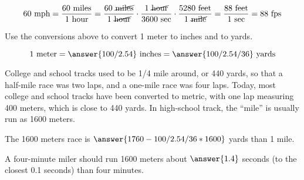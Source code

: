 \documentclass[nooutcomes]{ximera}
\begin{document}
\[
60 \textrm{ mph} = \frac{60\textrm{ miles}}{1\textrm{ hour}} 
=  \frac{60\textrm{ \cancel{miles}}}{1\textrm{ \cancel{hour}}} \cdot \frac{1\textrm{ \cancel{hour}}}{3600\textrm{ sec}} \cdot 
\frac{5280\textrm{ feet}}{{1\textrm{ \cancel{mile}}}} = \frac{88\textrm{ feet}}{1\textrm{ sec}} = 88 \textrm{ fps}
\]

\begin{question}
Use the conversions above to convert 1 meter to inches and to yards. 

\[
1\textrm{ meter} = \answer{100/2.54}\textrm{ inches} = \answer{100/2.54/36} \textrm{ yards}
\] 

\end{question}

\begin{question}
College and school tracks used to be 1/4 mile around, or 440 yards, so that a half-mile race was two laps, and a one-mile race was four laps.  Today, most college and school tracks have been converted to metric, with one lap measuring 400 meters, which is close to 440 yards.  In high-school track, the ``mile'' is usually run as 1600 meters.  

The 1600 meters race is $\answer{1760-100/2.54/36*1600}$ yards  than 1 mile.  

A four-minute miler should run 1600 meters about $\answer{1.4}$ seconds (to the closest 0.1 seconds)   than four minutes.  
\end{question}
\end{document}
